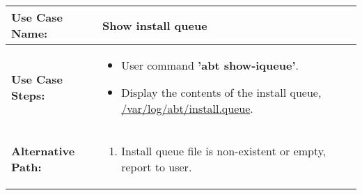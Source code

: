 \medskip

\begin{tabularx}{\linewidth}{|l|X|}
\hline
\textbf{Use Case Name:} & \textbf{Show install queue} \\
\hline
\textbf{Use Case Steps:} & 
\begin{minipage}{\linewidth} 
  \vspace{0.05em}
  \begin{itemize}
    \item User command \textbf{'abt show-iqueue'}.
    \item Display the contents of the install queue, \url{/var/log/abt/install.queue}.
  \end{itemize}
  \vspace{0.05em}
\end{minipage}
\\
\hline 
\textbf{Alternative Path:} &
\begin{minipage}{\linewidth}
  \vspace{0.05em} 
  \begin{enumerate}
    \item Install queue file is non-existent or empty, report to user.
  \end{enumerate}
  \vspace{0.05em} 
\end{minipage}
\\
\hline
\end{tabularx}